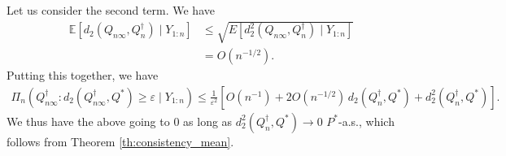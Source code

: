 \documentclass[11pt,a4paper]{article}
\newcommand{\E}{\mathbb{E}}
\begin{document}
\begin{appendices}
Let us consider the second term. We have
\begin{align*}
   \E\left[d_2\left(Q_{n\infty},Q_n^{\dagger}\right) \mid Y_{1:n} \right]&\leq \sqrt{E\left[d^2_2(Q_{n\infty},Q_n^{\dagger}) \mid Y_{1:n} \right]}\\
    &= O(n^{-1/2}).
\end{align*}
Putting this together, we have
\begin{align}\label{app:eq_on}
    \Pi_n \left(Q^{\dagger}_{n\infty}: d_2\left(Q_{n\infty}^{\dagger}, Q^*\right) \geq \varepsilon  \mid Y_{1:n}\right) \leq \frac{1}{\varepsilon^2}\left[O(n^{-1}) + 2O(n^{-1/2}) \, d_2(Q_n^{\dagger},Q^*) + d^2_2(Q_n^{\dagger},Q^*)\right].
\end{align}
We thus have the above going to 0 as long as $d^2_2(Q_n^{\dagger},Q^*) \to 0$ $P^*$-a.s., which follows from {Theorem \ref{th:consistency_mean}}.



\end{appendices}
\end{document}
